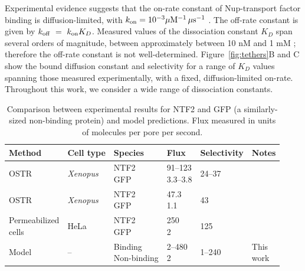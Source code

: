 Experimental evidence suggests that the on-rate constant of Nup-transport factor binding is diffusion-limited, with $k_{\rm on} = 10^{-3}\mu \mathrm{M}^{-1} \, \mu \mathrm{s}^{-1}$ \cite{milles15, hough15}.  The off-rate constant is given by $k_{\rm off} ~=~k_{\rm on} K_D$.  Measured values of the dissociation constant $K_D$ span several orders of magnitude, between approximately between 10 nM and 1 mM \cite{pyhtila03, gilchrist02, tetenbaum-novatt12-1, milles15, timney16, vovk16, hayama18}; therefore the off-rate constant is not well-determined.  Figure~\ref{fig:tethers}B and C show the bound diffusion constant and selectivity for a range of $K_D$ values spanning those measured experimentally, with a fixed, diffusion-limited on-rate.  Throughout this work, we consider a wide range of dissociation constants.

\begin{table}[b]
  \caption[Comparison between flux measurements and model predictions.]{Comparison between experimental results for NTF2 and GFP
    (a similarly-sized non-binding protein) and model
    predictions. Flux measured in units of molecules per pore per
    second.}
    \label{table:NTF2-flux}
    \begin{tabular}{p{2.3cm}p{1.4cm}p{2cm}p{1.3cm}p{1.8cm}p{0.8cm}}
      Method & Cell type & Species & Flux & Selectivity & Notes\\
      \hline
      OSTR & \textit{Xenopus} & \makecell[cl]{NTF2\\GFP} & \makecell[cl]{91--123\\3.3--3.8} & 24--37 
                         &\cite{siebrasse02}
      \\
      OSTR & \textit{Xenopus} & \makecell[cl]{NTF2\\GFP} & \makecell[cl]{47.3\\1.1} & 43 &  \cite{kiskin03}\\
      \makecell[cl]{Permeabilized \\ cells}  & HeLa &
                                                    \makecell[cl]{NTF2\\GFP} & \makecell[cl]{250\\2} & 125 & \cite{ribbeck01}\\
      Model & -- & \makecell[cl]{Binding\\Non-binding} & \makecell[cl]{2--480\\2} & 1--240 & \makecell[cl]{This\\work}\\ \hline
    \end{tabular}
\end{table}

